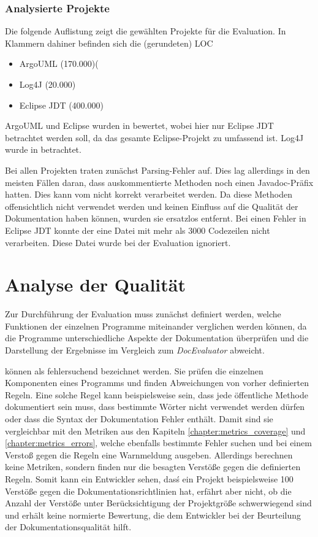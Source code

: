  \subsubsection{Analysierte Projekte}\label{chapter:eval_projects}
 Die folgende Auflistung zeigt die gewählten Projekte für die Evaluation. In Klammern dahiner befinden sich die  (gerundeten) \ac{LOC}
 \begin{itemize}
    \item ArgoUML (170.000)(
     \item Log4J (20.000)
     \item Eclipse \ac{JDT} (400.000)
 \end{itemize}
 
 ArgoUML und Eclipse wurden in \cite[S. 74] {AutomaticQualityAssessmentofSourceCodeComments:TheJavadocMiner} bewertet, wobei hier nur Eclipse \ac{JDT} betrachtet werden soll, da das gesamte Eclipse-Projekt zu umfassend ist. Log4J wurde in \cite[S. 267] {@tComment:TestingJavadocCommentstoDetectComment-CodeInconsistencies} betrachtet. 

 Bei allen Projekten traten zunächst Parsing-Fehler auf. Dies lag allerdings in den meisten Fällen daran, dass auskommentierte Methoden noch einen Javadoc-Präfix hatten. Dies kann vom \doceval nicht korrekt verarbeitet werden. Da diese Methoden offensichtlich nicht verwendet werden und keinen Einfluss auf die Qualität der Dokumentation haben können, wurden sie ersatzlos entfernt. Bei einen Fehler in Eclipse JDT konnte der \doceval eine Datei mit mehr als 3000 Codezeilen nicht verarbeiten. Diese Datei wurde bei der Evaluation ignoriert.
\section{Analyse der Qualität}
Zur Durchführung der Evaluation muss zunächst definiert werden, welche Funktionen der einzelnen Programme miteinander verglichen werden können, da die Programme unterschiedliche Aspekte der Dokumentation überprüfen und die Darstellung der Ergebnisse im Vergleich zum \textit{DocEvaluator} abweicht.

\checkpmd können als fehlersuchend bezeichnet werden. Sie prüfen die einzelnen Komponenten eines Programms und finden Abweichungen von vorher definierten Regeln. Eine solche Regel kann beispielsweise sein, dass jede öffentliche Methode dokumentiert sein muss, dass bestimmte Wörter nicht verwendet werden dürfen oder dass die Syntax der Dokumentation Fehler enthält. Damit sind sie vergleichbar mit den Metriken aus den Kapiteln \ref{chapter:metrics_coverage}  und \ref{chapter:metrics_errors}, welche ebenfalls bestimmte Fehler suchen und bei einem Verstoß gegen die Regeln eine Warnmeldung ausgeben. Allerdings berechnen \checkpmd keine Metriken, sondern finden nur die besagten Verstöße gegen die definierten Regeln. Somit kann ein Entwickler sehen, dasś ein Projekt beispielsweise 100 Verstöße gegen die Dokumentationsrichtlinien hat, erfährt aber nicht, ob die Anzahl der Verstöße unter Berücksichtigung der Projektgröße schwerwiegend sind und erhält keine normierte Bewertung, die dem Entwickler bei der Beurteilung der Dokumentationsqualität hilft. 

